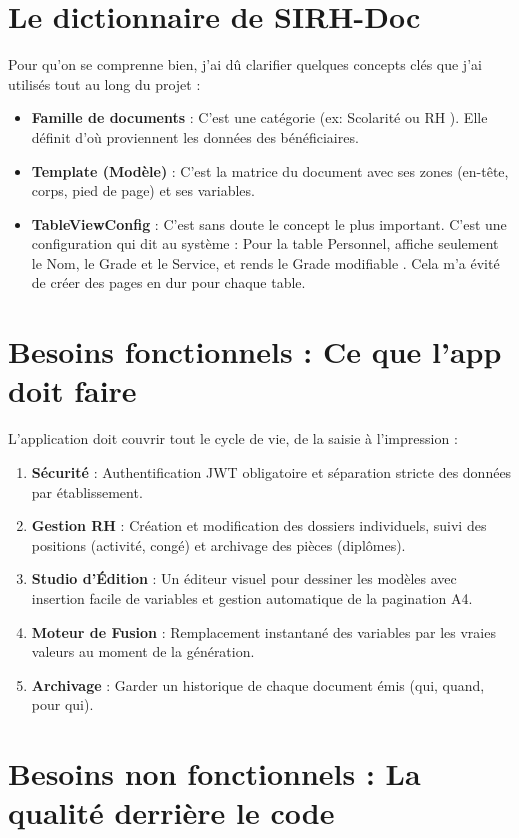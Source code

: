 \section{Le dictionnaire de SIRH-Doc}

Pour qu'on se comprenne bien, j'ai dû clarifier quelques concepts clés que j'ai utilisés tout au long du projet :
\begin{itemize}
    \item \textbf{Famille de documents} : C'est une catégorie (ex: \og Scolarité \fg{} ou \og RH \fg{}). Elle définit d'où proviennent les données des bénéficiaires.
    \item \textbf{Template (Modèle)} : C'est la matrice du document avec ses zones (en-tête, corps, pied de page) et ses variables.
    \item \textbf{TableViewConfig} : C'est sans doute le concept le plus important. C'est une configuration qui dit au système : \og Pour la table Personnel, affiche seulement le Nom, le Grade et le Service, et rends le Grade modifiable \fg{}. Cela m'a évité de créer des pages en dur pour chaque table.
\end{itemize}

\section{Besoins fonctionnels : Ce que l'app doit faire}

L'application doit couvrir tout le cycle de vie, de la saisie à l'impression :
\begin{enumerate}
    \item \textbf{Sécurité} : Authentification JWT obligatoire et séparation stricte des données par établissement.
    \item \textbf{Gestion RH} : Création et modification des dossiers individuels, suivi des positions (activité, congé) et archivage des pièces (diplômes).
    \item \textbf{Studio d'Édition} : Un éditeur visuel pour dessiner les modèles avec insertion facile de variables et gestion automatique de la pagination A4.
    \item \textbf{Moteur de Fusion} : Remplacement instantané des variables par les vraies valeurs au moment de la génération.
    \item \textbf{Archivage} : Garder un historique de chaque document émis (qui, quand, pour qui).
\end{enumerate}

\section{Besoins non fonctionnels : La qualité derrière le code}

